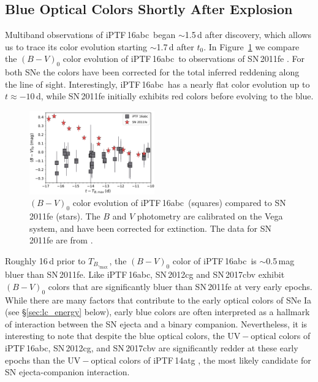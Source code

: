 \documentclass[twocolumn]{aastex61}
\newcommand{\abc}{iPTF\,16abc}
\begin{document}
\subsection{Blue Optical Colors Shortly After Explosion}

Multiband observations of \abc\ began $\sim$1.5\,d after discovery, which
allows us to trace its color evolution starting $\sim$1.7\,d after $t_0$. In
Figure~\ref{fig:B-Vcolors} we compare the $(B - V)_0$ color evolution of \abc\
to observations of SN\,2011fe \citep{2016ApJ...820...67Z}. For both SNe the
colors have been corrected for the total inferred reddening along the line of
sight. Interestingly, \abc\ has a nearly flat color evolution up to $t \approx
-10$\,d, while SN\,2011fe initially exhibits red colors before evolving to the
blue.

\begin{figure}[]
  \centering
  \includegraphics[width=0.48\textwidth]{16abc_11fe_colors.pdf}
  \caption{$(B - V)_0$ color evolution of \abc\ (squares) 
    compared to SN\,2011fe (stars). The $B$ and $V$ photometry are calibrated
    on the Vega system, and have been corrected for extinction. The data for
    SN\,2011fe are from \citet{2016ApJ...820...67Z}.}
  \label{fig:B-Vcolors}
\end{figure}

Roughly 16\,d prior to $T_{B,_\mathrm{max}}$, the $(B - V)_0$ color of \abc\ is
$\sim$0.5\,mag bluer than SN\,2011fe. Like \abc, SN\,2012cg
\citep{2016ApJ...820...92M} and SN\,2017cbv \citep{2017ApJ...845L..11H}
exhibit $(B - V)_0$ colors that are significantly bluer than SN\,2011fe at
very early epochs. While there are many factors that contribute to the early
optical colors of SNe Ia (see \S\ref{sec:lc_energy} below), early blue colors
are often interpreted as a hallmark of interaction between the SN ejecta and a
binary companion. Nevertheless, it is interesting to note that despite the
blue optical colors, the $\mathrm{UV} - \mathrm{optical}$ colors of \abc,
SN\,2012cg, and SN\,2017cbv are significantly redder at these early epochs
than the $\mathrm{UV} - \mathrm{optical}$ colors of iPTF\,14atg
\citep{2015Natur.521..328C}, the most likely candidate for SN ejecta-companion
interaction.
\end{document}

